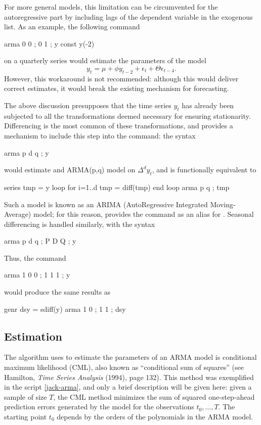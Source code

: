 For more general models, this limitation can be circumvented for the
autoregressive part by including lags of the dependent variable in the
exogenous list. As an example, the following command 
\begin{code}
  arma 0 0 ; 0 1 ; y const y(-2)
\end{code}
on a quarterly series would estimate the parameters of the model
\[
  y_t = \mu + \phi y_{t-2} + \epsilon_t + \Theta \epsilon_{t-4}.
\]
However, this workaround is not recommended: although this would
deliver correct estimates, it would break the existing mechanism for
forecasting.

The above discussion presupposes that the time series $y_t$ has
already been subjected to all the transformations deemed necessary for
ensuring stationarity. Differencing is the most common of these
transformations, and  provides a mechanism to include this
step into the  command: the syntax
\begin{code}
  arma p d q ; y 
\end{code}
would estimate and ARMA(p,q) model on $\Delta^d y_t$, and is
functionally equivalent to 
\begin{code}
  series tmp = y
  loop for i=1..d
    tmp = diff(tmp)
  end loop
  arma p q ; tmp 
\end{code}
Such a model is known as an ARIMA (AutoRegressive Integrated
Moving-Average) model; for this reason,  provides the
 command as an alias for . Seasonal differencing
is handled similarly, with the syntax
\begin{code}
  arma p d q ; P D Q ; y 
\end{code}
Thus, the command 
\begin{code}
  arma 1 0 0 ; 1 1 1 ; y 
\end{code}
would produce the same results as
\begin{code}
  genr dsy = sdiff(y)
  arma 1 0 ; 1 1 ; dsy 
\end{code}

\subsection{Estimation}
\label{arma-est}

The algorithm  uses to estimate the parameters of an ARMA
model is conditional maximum likelihood (CML), also known as
``conditional sum of squares'' (see Hamilton, \emph{Time Series
  Analysis} (1994), page 132). This method was exemplified in the
script \ref{jack-arma}, and only a brief description will be given
here: given a sample of size $T$, the CML method minimizes the sum of
squared one-step-ahead prediction errors generated by the model for
the observations $t_0, \ldots, T$. The starting point $t_0$ depends by
the orders of the polynomials in the ARMA model.

